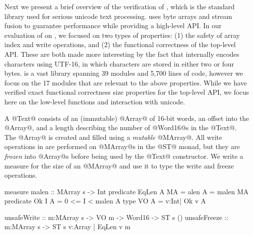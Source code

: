 Next %
we present a brief overview of the verification of \libtext, which 
is the standard library used for serious unicode text processing. 
\libtext uses byte arrays and stream fusion to guarantee 
performance while providing a high-level API.
In our evaluation of \toolname on \libtext,%
we focused on two types of properties: 
(1) the safety of array index and write operations, and 
(2) the functional correctness of the top-level API.
%
These are both made more interesting by the fact that 
\libtext internally encodes characters using UTF-16, 
in which characters are stored in either two or four bytes.
%
\libtext is a vast library spanning 39 modules and 5,700 lines of
code, however we focus on the 17 modules that are relevant
to the above properties.
%
While we have verified exact functional correctness size properties
for the top-level API, we focus here on the low-level functions 
and interaction with unicode.

A @Text@ consists of an (immutable) @Array@ of 16-bit words,
an offset into the @Array@, and a length describing the
number of @Word16@s in the @Text@.  
The @Array@ is created and filled using a
\emph{mutable} @MArray@. 
All write operations in \libtext are performed on @MArray@s 
in the @ST@ monad, but they are \emph{frozen} into @Array@s
before being used by the @Text@ constructor.
%
We write a measure for the size of an @MArray@ and use
it to type the write and freeze operations.
%
\begin{code}
  measure malen       :: MArray s -> Int
  predicate EqLen A MA = alen A = malen MA
  predicate Ok I A     = 0 <= I < malen A
  type VO A            = {v:Int| Ok v A} 
  
  unsafeWrite  :: m:MArray s
               -> VO m -> Word16 -> ST s ()
  unsafeFreeze :: m:MArray s
               -> ST s {v:Array | EqLen v m}
\end{code}

